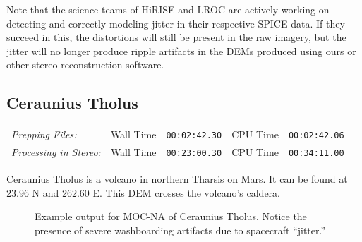 Note that the science teams of \ac{HiRISE} and \ac{LROC} are actively
working on detecting and correctly modeling jitter in their respective
SPICE data. If they succeed in this, the distortions will still
be present in the raw imagery, but the jitter will no longer produce
ripple artifacts in the DEMs produced using ours or other stereo
reconstruction software.

\subsection{Ceraunius Tholus}

\begin{tabular}{l r c r c}
\textit{Prepping Files:}       & Wall Time & \texttt{00:02:42.30} & CPU Time & \texttt{00:02:42.06} \\
\textit{Processing in Stereo:} & Wall Time & \texttt{00:23:00.30} & CPU Time & \texttt{00:34:11.00} \\
\end{tabular}

Ceraunius Tholus is a volcano in northern Tharsis on Mars. It can
be found at 23.96 N and 262.60 E. This \ac{DEM} crosses the volcano's
caldera.

\begin{figure}[h]
\centering
  \hfil
\caption{Example output for MOC-NA of Ceraunius Tholus. Notice the presence of severe washboarding artifacts due to spacecraft ``jitter.''}
\label{fig:mocna_ceraunius_example}
\end{figure}


